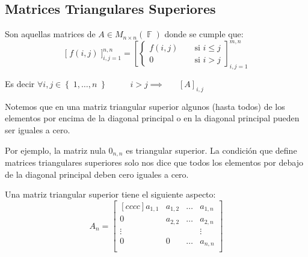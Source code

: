 \documentclass[12pt, fleqn]{report}                             %
\DeclareMathOperator \Space {\quad}                             %
\DeclareMathOperator \MegaSpace {\quad \quad}                   %
\DeclareMathOperator \MiniSpace {\;}                            %
\theoremstyle{break}                                            %
\DeclareMathOperator \GenericField {\mathbb{F}}                 %
\newcommand{\Set}[1]{\left\{ \; #1 \; \right\}}                 %
\newcommand{\Brackets}[1]{\left[ #1 \right]}                    %
\newcommand{\BigBrackets}[1]{\Big[ \; #1 \; \Big]}              %
\begin{document}
            \clearpage
            \subsection{Matrices Triangulares Superiores}

                Son aquellas matrices de $A \in M_{n \times n}(\GenericField)$ donde se cumple que: 
                \begin{equation*}
                    \BigBrackets{f(i,j)}_{i, j = 1}^{n, n}
                    =
                    \Brackets{
                        \begin{cases}
                            f(i,j)  \MiniSpace& \text{ si } i \leq j \\
                            0       \MiniSpace& \text{ si } i > j
                        \end{cases}
                    }_{i, j = 1}^{m, n}  
                \end{equation*}

                Es decir $\forall i, j \in \Set{1, \dots, n} \MegaSpace i > j \implies \Space [A]_{i, j}$

                \vspace{1em}

                Notemos que en una matriz triangular superior algunos (hasta todos) de los elementos
                por encima de la diagonal principal o en la diagonal principal pueden ser iguales a cero.

                Por ejemplo, la matriz nula $0_{n,n}$ es triangular superior. La condición que define
                matrices triangulares superiores solo nos dice que todos los elementos por debajo de la
                diagonal principal deben cero iguales a cero.

                Una matriz triangular superior tiene el siguiente aspecto:
                \begin{equation*}
                    A_n =
                    \begin{bmatrix}[cccc]
                        a_{1,1} & a_{1, 2}  & \dots & a_{1, n}  \\
                        0       & a_{2,2}   & \dots & a_{2, n}  \\
                        \vdots  &           &       & \vdots    \\
                        0       & 0         & \dots & a_{n,n}   \\
                    \end{bmatrix}
                \end{equation*}
\end{document}
